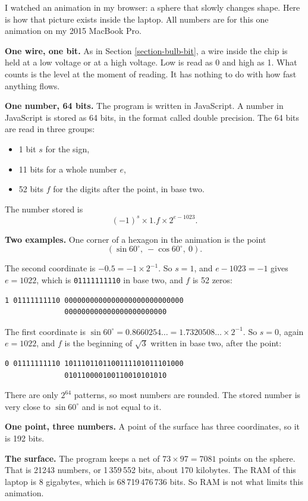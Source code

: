 I watched an animation in my browser: a
sphere that slowly changes shape. Here is
how that picture exists inside the laptop.
All numbers are for this one animation on
my 2015 MacBook Pro.

\medskip\noindent
{\bf One wire, one bit.}
As in Section \ref{section-bulb-bit}, a wire
inside the chip is held at a low voltage or
at a high voltage. Low is read as 0 and high
as 1. What counts is the level at the moment
of reading. It has nothing to do with how
fast anything flows.

\medskip\noindent
{\bf One number, 64 bits.}
The program is written in JavaScript. A
number in JavaScript is stored as 64 bits,
in the format called double precision. The
64 bits are read in three groups:
\begin{itemize}
\item 1 bit $s$ for the sign,
\item 11 bits for a whole number $e$,
\item 52 bits $f$ for the digits after the
point, in base two.
\end{itemize}
The number stored is
$$
(-1)^s \times 1.f \times 2^{e-1023}.
$$

\medskip\noindent
{\bf Two examples.}
One corner of a hexagon in the animation is
the point
$$
(\sin 60^\circ,\ -\cos 60^\circ,\ 0).
$$

The second coordinate is $-0.5 = -1 \times
2^{-1}$. So $s = 1$, and $e - 1023 = -1$
gives $e = 1022$, which is
{\tt 01111111110} in base two, and $f$ is 52
zeros:
\begin{verbatim}
1 01111111110 0000000000000000000000000000
              000000000000000000000000
\end{verbatim}

The first coordinate is $\sin 60^\circ =
0.8660254\ldots = 1.7320508\ldots \times
2^{-1}$. So $s = 0$, again $e = 1022$, and
$f$ is the beginning of $\sqrt 3$ written in
base two, after the point:
\begin{verbatim}
0 01111111110 1011101101100111101011101000
              010110000100110010101010
\end{verbatim}
There are only $2^{64}$ patterns, so most
numbers are rounded. The stored number is
very close to $\sin 60^\circ$ and is not
equal to it.

\medskip\noindent
{\bf One point, three numbers.}
A point of the surface has three
coordinates, so it is 192 bits.

\medskip\noindent
{\bf The surface.}
The program keeps a net of $73 \times 97 =
7081$ points on the sphere. That is 21243
numbers, or 1\,359\,552 bits, about 170
kilobytes. The RAM of this laptop is 8
gigabytes, which is 68\,719\,476\,736 bits.
So RAM is not what limits this animation.

